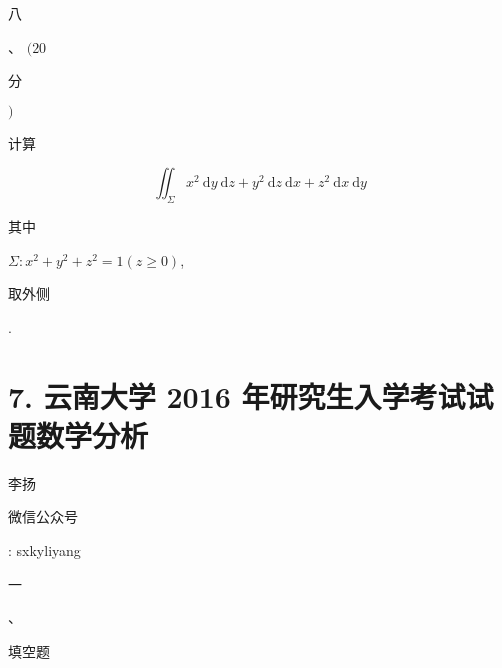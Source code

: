 \documentclass[10pt]{article}
\begin{document}
\begin{CJK}{UTF8}{mj}八\end{CJK}、 $(20$ \begin{CJK}{UTF8}{mj}分\end{CJK} $)$ \begin{CJK}{UTF8}{mj}计算\end{CJK}
$$
\iint_{\Sigma} x^{2} \mathrm{~d} y \mathrm{~d} z+y^{2} \mathrm{~d} z \mathrm{~d} x+z^{2} \mathrm{~d} x \mathrm{~d} y
$$
\begin{CJK}{UTF8}{mj}其中\end{CJK} $\Sigma: x^{2}+y^{2}+z^{2}=1(z \geqslant 0)$, \begin{CJK}{UTF8}{mj}取外侧\end{CJK}.

\section{7. 云南大学 2016 年研究生入学考试试题数学分析}
\begin{CJK}{UTF8}{mj}李扬\end{CJK}

\begin{CJK}{UTF8}{mj}微信公众号\end{CJK}: sxkyliyang

\begin{CJK}{UTF8}{mj}一\end{CJK}、\begin{CJK}{UTF8}{mj}填空题\end{CJK}
\end{document}
